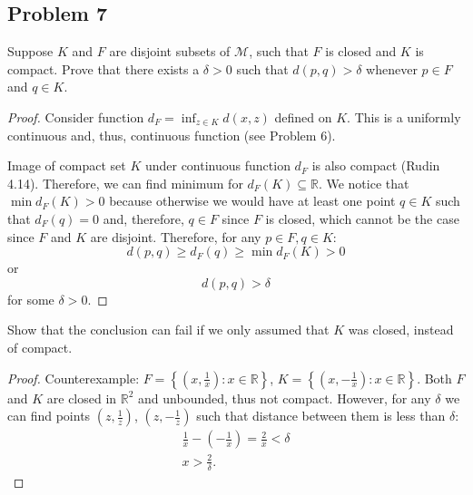 \documentclass{article}
\newcommand{\R}{\mathbb{R}}
\begin{document}
\subsection*{Problem 7}

\begin{tcolorbox}
Suppose $K$ and $F$ are disjoint subsets of $\mathcal{M}$, such that $F$ is closed and $K$ is compact. Prove that there exists a $\delta > 0$ such that $d (p, q) > \delta$ whenever $p \in F$ and $q \in K$.
\end{tcolorbox}

\begin{proof}

Consider function $d_F=\inf_{z \in K} d(x,z)$ defined on $K$.
This is a uniformly continuous and, thus, continuous function (see Problem 6).

Image of compact set $K$ under continuous function $d_F$ is also compact (Rudin 4.14).
Therefore, we can find minimum for $d_F(K) \subseteq \R$.
We notice that $\min d_F(K) > 0$ because otherwise we would have at least one point $q \in K$ such that $d_F(q) = 0$ and, therefore, $q \in F$ since $F$ is closed, which cannot be the case since $F$ and $K$ are disjoint.
Therefore, for any $p \in F, q \in K$:
\[ d(p,q) \geq d_F(q) \geq \min d_F(K) > 0 \]
or 
\[ d(p,q) > \delta \]
for some $\delta > 0$.

\end{proof}

\begin{tcolorbox}
 Show that the conclusion can fail if we only assumed that $K$ was closed, instead of compact.
\end{tcolorbox}

\begin{proof}

Counterexample: $F = \left\{ \left(x,\frac{1}{x}\right) : x\in\R \right\}$, $K = \left\{ \left(x,-\frac{1}{x}\right) : x\in\R \right\}$.
Both $F$ and $K$ are closed in $\R^2$ and unbounded, thus not compact.
However, for any $\delta$ we can find points $\left( z, \frac{1}{z} \right)$, $\left( z, -\frac{1}{z} \right)$ such that distance between them is less than $\delta$:
\begin{gather*}
    \frac{1}{x} - \left( - \frac{1}{x} \right) = \frac{2}{x} < \delta \\
    x > \frac{2}{\delta}.    
\end{gather*}


\end{proof}
\end{document}
